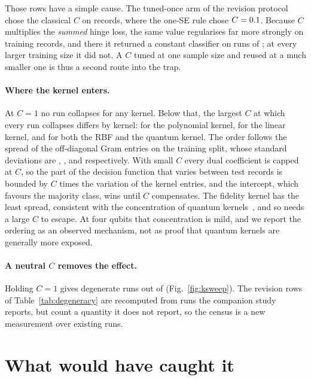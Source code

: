 \documentclass[runningheads]{llncs}
\begin{document}
Those rows have a simple cause. The tuned-once arm of the revision protocol
chose the classical $C$ on \prevTuneN{} records, where the one-SE rule chose $C = 0.1$.
Because $C$ multiplies the \emph{summed} hinge loss, the same value
regularises far more strongly on \plegacyN{} training records, and there it
returned a constant classifier on \prevDegRows{} runs of \prevRuns; at every larger training
size it did not. A $C$ tuned at one sample size and reused at a much smaller
one is thus a second route into the trap.

\paragraph{Where the kernel enters.}
At $C = 1$ no run collapses for any kernel. Below that, the largest $C$ at
which every run collapses differs by kernel: \pedgePoly{} for the polynomial
kernel, \pedgeLin{} for the linear kernel, and \pedgeRbf{} for both the RBF
and the quantum kernel. The order follows the spread of the off-diagonal Gram
entries on the training split, whose standard deviations are \pspreadPoly,
\pspreadLin, \pspreadRbf{} and \pspreadQ{} respectively. With small $C$ every
dual coefficient is capped at $C$, so the part of the decision function that
varies between test records is bounded by $C$ times the variation of the
kernel entries, and the intercept, which favours the majority class, wins
until $C$ compensates. The fidelity kernel has the least spread, consistent
with the concentration of quantum kernels~\cite{thanasilp2024concentration},
and so needs a large $C$ to escape. At four qubits that concentration is mild,
and we report the ordering as an observed mechanism, not as proof that quantum
kernels are generally more exposed.

\paragraph{A neutral $C$ removes the effect.}
Holding $C = 1$ gives \pkSweepDeg{} degenerate runs out of \pkSweepRuns{}
(Fig.~\ref{fig:ksweep}). The revision rows of Table~\ref{tab:degeneracy}
are recomputed from runs the companion study~\cite{companion} reports, but
count a quantity it does not report, so the census is a new measurement over
existing runs.

\section{What would have caught it}\label{sec:catch}
\end{document}
